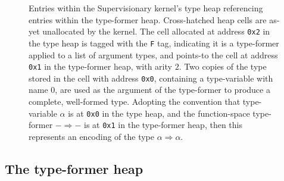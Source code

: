 \documentclass[a4paper, UKenglish, cleveref, autoref, thm-restate, colorlinks]{lipics-v2021}
\begin{document}
\begin{figure}
\caption{Entries within the Supervisionary kernel's type heap referencing entries within the type-former heap.
Cross-hatched heap cells are as-yet unallocated by the kernel.
The cell allocated at address \texttt{0x2} in the type heap is tagged with the \texttt{F} tag, indicating it is a type-former applied to a list of argument types, and points-to the cell at address \texttt{0x1} in the type-former heap, with arity $2$.
Two copies of the type stored in the cell with address \texttt{0x0}, containing a type-variable with name $0$, are used as the argument of the type-former to produce a complete, well-formed type.
Adopting the convention that type-variable $\alpha$ is at \texttt{0x0} in the type heap, and the function-space type-former $- \Rightarrow- $ is at \texttt{0x1} in the type-former heap, then this represents an encoding of the type $\alpha \Rightarrow \alpha$.}
\label{fig.type-former.type.heap}
\end{figure}

\subsection{The type-former heap}
\end{document}
